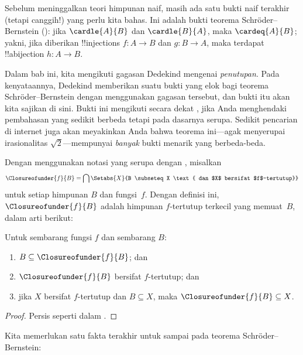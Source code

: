 \documentclass[../../../include/open-logic-section]{subfiles}
\begin{document}


Sebelum meninggalkan teori himpunan naif, masih ada satu bukti naif terakhir
(tetapi canggih!) yang perlu kita bahas. Ini adalah bukti teorema
Schr\"oder--Bernstein (): jika
$\cardle{A}{B}$ dan $\cardle{B}{A}$, maka $\cardeq{A}{B}$; yakni, jika
diberikan !!{injection}s $f \colon A \to B$ dan $g \colon B \to A$, maka
terdapat !!a{bijection} $h \colon A \to B$.

Dalam bab ini, kita mengikuti gagasan Dedekind mengenai \emph{penutupan}.
Pada kenyataannya, Dedekind memberikan suatu bukti yang elok bagi teorema
Schr\"oder--Bernstein dengan menggunakan gagasan tersebut, dan bukti itu
akan kita sajikan di sini. Bukti ini mengikuti secara dekat
\citet[pp.~157--8]{Potter2004}, jika Anda menghendaki pembahasan yang sedikit
berbeda tetapi pada dasarnya serupa. Sedikit pencarian di internet juga akan
meyakinkan Anda bahwa teorema ini---agak menyerupai irasionalitas
$\sqrt{2}$---mempunyai \emph{banyak} bukti menarik yang berbeda-beda.

Dengan menggunakan notasi yang serupa dengan
, misalkan
\[
\Closureofunder{f}{B} = \bigcap \Setabs{X}{B \subseteq X
\text{ dan $X$ bersifat $f$-tertutup}}
\]
untuk setiap himpunan $B$ dan fungsi~$f$. Dengan definisi ini,
$\Closureofunder{f}{B}$ adalah himpunan $f$-tertutup terkecil yang
memuat~$B$, dalam arti berikut:

\begin{lem}
	Untuk sembarang fungsi $f$ dan sembarang $B$:
	\begin{enumerate}
		\item{} $B \subseteq \Closureofunder{f}{B}$; dan
		\item{} $\Closureofunder{f}{B}$ bersifat $f$-tertutup; dan
		\item{} jika $X$ bersifat $f$-tertutup dan $B
		\subseteq X$, maka $\Closureofunder{f}{B} \subseteq X$.
	\end{enumerate}
\end{lem}

\begin{proof}
Persis seperti dalam
.
\end{proof}

Kita memerlukan satu fakta terakhir untuk sampai pada teorema
Schr\"oder--Bernstein:
\end{document}
